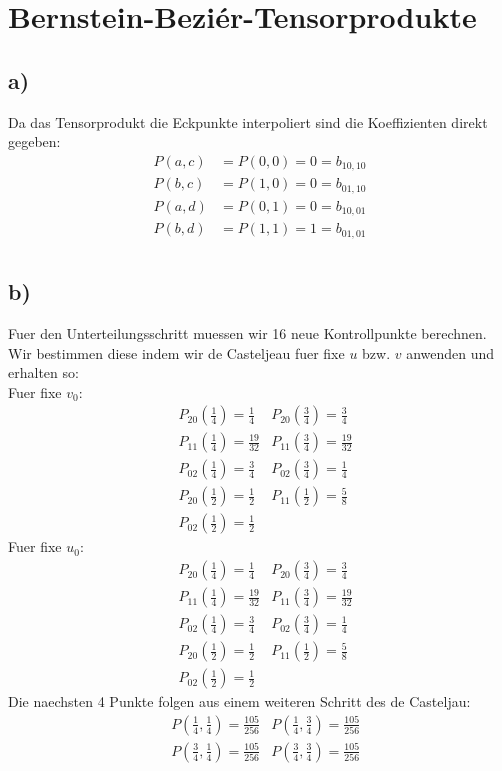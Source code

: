 
\section*{Bernstein-Bezi\'er-Tensorprodukte}
\subsection*{a)} 


Da das Tensorprodukt die Eckpunkte interpoliert sind die Koeffizienten direkt gegeben:
\begin{align}
	P(a,c) &= P(0,0) = 0 = b_{10,10} \\
	P(b,c) &= P(1,0) = 0 = b_{01,10} \\
	P(a,d) &= P(0,1) = 0 = b_{10,01} \\
	P(b,d) &= P(1,1) = 1 = b_{01,01} \\
\end{align}


\subsection*{b)}
Fuer den Unterteilungsschritt muessen wir 16 neue Kontrollpunkte berechnen. Wir bestimmen diese indem wir de Casteljeau fuer fixe $u$ bzw. $v$ anwenden und erhalten so:\\
Fuer fixe $v_0$:
\begin{align}
	&P_{20}(\frac{1}{4}) = \frac{1}{4} 
	&P_{20}(\frac{3}{4}) = \frac{3}{4} \\
	&P_{11}(\frac{1}{4}) = \frac{19}{32} 
	&P_{11}(\frac{3}{4}) = \frac{19}{32} \\
	&P_{02}(\frac{1}{4}) = \frac{3}{4} 	
	&P_{02}(\frac{3}{4}) = \frac{1}{4} \\
	&P_{20}(\frac{1}{2}) = \frac{1}{2}
	&P_{11}(\frac{1}{2}) = \frac{5}{8} \\
	&P_{02}(\frac{1}{2}) = \frac{1}{2}
\end{align}
Fuer fixe $u_0$:
\begin{align}
	&P_{20}(\frac{1}{4}) = \frac{1}{4} 
	&P_{20}(\frac{3}{4}) = \frac{3}{4} \\
	&P_{11}(\frac{1}{4}) = \frac{19}{32} 
	&P_{11}(\frac{3}{4}) = \frac{19}{32} \\
	&P_{02}(\frac{1}{4}) = \frac{3}{4} 	
	&P_{02}(\frac{3}{4}) = \frac{1}{4}\\
	&P_{20}(\frac{1}{2}) = \frac{1}{2}
	&P_{11}(\frac{1}{2}) = \frac{5}{8} \\
	&P_{02}(\frac{1}{2}) = \frac{1}{2} 
\end{align}
Die naechsten 4 Punkte folgen aus einem weiteren Schritt des de Casteljau:
\begin{align}
	&P(\frac{1}{4},\frac{1}{4}) = \frac{105}{256} 
	&P(\frac{1}{4},\frac{3}{4}) = \frac{105}{256} \\
	&P(\frac{3}{4},\frac{1}{4}) = \frac{105}{256} 
	&P(\frac{3}{4},\frac{3}{4}) = \frac{105}{256} 
\end{align}

